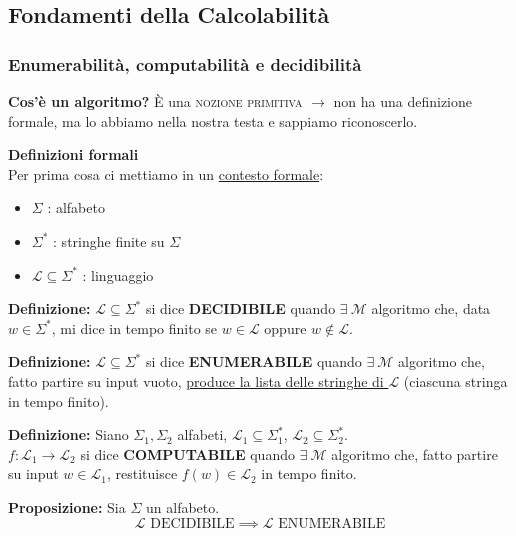 \subsection{Fondamenti della Calcolabilità}
\subsubsection{Enumerabilità, computabilità e decidibilità}

\textbf{Cos'è un algoritmo?}
È una \textsc{nozione primitiva} $\longrightarrow$ non ha una definizione formale, ma lo abbiamo nella nostra testa e sappiamo riconoscerlo.

\vspace{0.4cm}
\textbf{Definizioni formali} \\
Per prima cosa ci mettiamo in un \underline{contesto formale}:
\begin{itemize}
    \item $\Sigma$ : alfabeto
    \item $\Sigma^*$ : stringhe finite su $\Sigma$
    \item $\mathcal{L} \subseteq \Sigma^*$ : linguaggio
\end{itemize}

\vspace{0.4cm}
\textbf{Definizione:} $\mathcal{L} \subseteq \Sigma^*$ si dice \textbf{DECIDIBILE} quando $\exists\ \mathcal{M}$ algoritmo che, data $w \in \Sigma^*$, mi dice in tempo finito se $w \in \mathcal{L}$ oppure $w \notin \mathcal{L}$.

\vspace{0.4cm}
\textbf{Definizione:} $\mathcal{L} \subseteq \Sigma^*$ si dice \textbf{ENUMERABILE} quando $\exists\ \mathcal{M}$ algoritmo che, fatto partire su input vuoto, \underline{produce la lista delle stringhe di $\mathcal{L}$} (ciascuna stringa in tempo finito).

\vspace{0.4cm}
\textbf{Definizione:} Siano $\Sigma_1, \Sigma_2$ alfabeti, $\mathcal{L}_1 \subseteq \Sigma_1^*$, $\mathcal{L}_2 \subseteq \Sigma_2^*$. \\
$f: \mathcal{L}_1 \to \mathcal{L}_2$ si dice \textbf{COMPUTABILE} quando $\exists\ \mathcal{M}$ algoritmo che, fatto partire su input $w \in \mathcal{L}_1$, restituisce $f(w) \in \mathcal{L}_2$ in tempo finito.

\vspace{0.4cm}
\textbf{Proposizione:} Sia $\Sigma$ un alfabeto.
$$\mathcal{L} \text{ DECIDIBILE} \implies \mathcal{L} \text{ ENUMERABILE}$$

